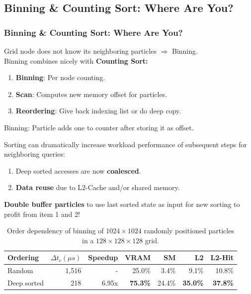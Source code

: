 \documentclass{beamer}
\begin{document}
\subsection{Binning \& Counting Sort: Where Are You?}
\begin{frame}
\frametitle{Binning \& Counting Sort: Where Are You?}

Grid node does not know its neighboring particles $\Rightarrow$ Binning.
\\\vspace{10}
Binning combines nicely with \textbf{Counting Sort:}\\
\begin{minipage}{0.55\textwidth}
\begin{enumerate}
  \item \textbf{Binning}: Per node counting.
  \item \textbf{Scan}: Computes new memory offset for particles.
  \item \textbf{Reordering}: Give back indexing list or do deep copy.
\end{enumerate}
\end{minipage}
\begin{minipage}{0.40\textwidth}
  \footnotesize
 
 \caption{\footnotesize Binning: Particle adds one
to counter after storing it as offset.}
 \end{minipage}
\end{frame}

\begin{frame}
Sorting can dramatically increase workload performance of subsequent steps for neighboring queries:
\begin{enumerate}
  \item Deep sorted accesses are now \textbf{coalesced}. \label{it:sort_1}
  \item \textbf{Data reuse} due to L2-Cache and/or shared memory. \label{it:sort_2}
\end{enumerate}
\textbf{Double buffer particles} to use last sorted state as input for new sorting to profit from item 1 and 2!
\begin{table}
  \footnotesize
  \begin{tabular}{ | l | r | r | r | r| r |r|}    \hline
    Ordering            &  $\Delta t_c (\mu s)$ & Speedup &VRAM              & SM      & L2     & L2-Hit \\\hline
    Random              &  1,516                & -       &25.0\%            & 3.4\%   & 9.1\%  & 10.8\% \\\hline
    Deep sorted           &    218                & 6.95x   &\textbf{75.3\%}   & 24.4\%  & \textbf{35.0\%} & \textbf{37.8\%} \\
    \hline
 \end{tabular}
\caption{\footnotesize Order dependency of binning of $1024\times1024$ randomly positioned particles in a $128\times128\times128$ grid.}\label{table:bin}
\end{table}
\end{frame}
\end{document}
